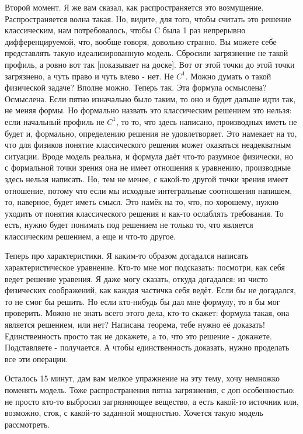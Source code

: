 Второй момент. Я же вам сказал, как распространяется это возмущение. Распространяется волна такая. Но, видите, для того, чтобы считать это решение классическим, нам потребовалось, чтобы C была 1 раз непрерывно дифференцируемой, что, вообще говоря, довольно странно. Вы можете себе представлять такую идеализированную модель. Сбросили загрязнение не такой профиль, а ровно вот так [показывает на доске]. Вот от этой точки до этой точки загрязнено, а чуть право и чуть влево - нет. Не $C^1$. Можно думать о такой физической задаче? Вполне можно. Теперь так. Эта формула осмыслена? Осмыслена. Если пятно изначально было таким, то оно и будет дальше идти так, не меняя формы. Но формально назвать это классическим решением это нельзя: если начальный профиль не $C^1$, то то, что здесь написано, производных иметь не будет и, формально, определению решения не удовлетворяет. Это намекает на то, что для физиков понятие классического решения может оказаться неадекватным ситуации. Вроде модель реальна, и формула даёт что-то разумное физически, но с формальной точки зрения она не имеет отношения к уравнению, производные здесь нельзя написать. Но, тем не менее, с какой-то другой точки зрения имеет отношение, потому что если мы исходные интегральные соотношения напишем, то, наверное, будет иметь смысл. Это намёк на то, что, по-хорошему, нужно уходить от понятия классического решения и как-то ослаблять требования. То есть, нужно будет понимать под решением не только то, что является классическим решением, а еще и что-то другое.

Теперь про характеристики. Я каким-то образом догадался написать характеристическое уравнение. Кто-то мне мог подсказать: посмотри, как себя ведет решение уравения. Я даже могу сказать, откуда догадался: из чисто физических соображений, как каждая частичка себя ведёт. Если бы не догадался, то не смог бы решить. Но если кто-нибудь бы дал мне формулу, то я бы мог проверить. Можно не знать всего этого дела, кто-то скажет: формула такая, она является решением, или нет? Написана теорема, тебе нужно её доказать! Единственность просто так не докажете, а то, что это решение - докажете. Подставляете - получается. А чтобы единственность доказать, нужно проделать все эти операции.

Осталось 15 минут, дам вам мелкое упражнение на эту тему, хочу немножко поменять модель.
Тоже распространения пятна загрязнения, с доп особенностью: не просто кто-то выбросил загрязняющее вещество, а есть какой-то источник или, возможно, сток, с какой-то заданной мощностью. Хочется такую модель рассмотреть.

